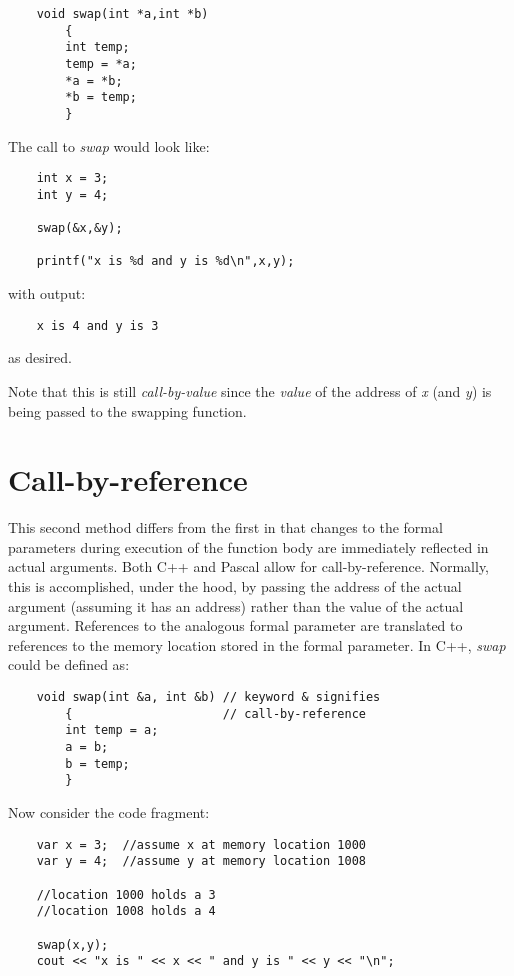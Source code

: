 \begin{verbatim}
    void swap(int *a,int *b)
        {
        int temp;
        temp = *a;
        *a = *b;
        *b = temp;
        }
\end{verbatim}

The call to {\it swap} would look like:

\begin{verbatim}
    int x = 3;
    int y = 4;

    swap(&x,&y);

    printf("x is %d and y is %d\n",x,y);
\end{verbatim}

with output:

\begin{verbatim}
    x is 4 and y is 3
\end{verbatim}

as desired.

Note that this is still {\it call-by-value} since the {\it value} of the
address of {\it x} (and {\it y}) is being passed to the swapping function.

\section*{Call-by-reference}

This second method differs from the first in that changes to
the formal parameters during execution of the function body are
immediately reflected in actual arguments. Both C++ and Pascal allow
for call-by-reference. Normally, this is accomplished,
under the hood, by passing the
address of the actual argument (assuming it has an address) rather than
the value of the actual argument. References to the analogous formal
parameter are translated to references to the memory location stored in
the formal parameter. In C++, {\it swap} could be defined as:

\begin{verbatim}
    void swap(int &a, int &b) // keyword & signifies
        {                     // call-by-reference
        int temp = a;
        a = b;
        b = temp;
        }
\end{verbatim}

Now consider the code fragment:

\begin{verbatim}
    var x = 3;  //assume x at memory location 1000
    var y = 4;  //assume y at memory location 1008

    //location 1000 holds a 3
    //location 1008 holds a 4

    swap(x,y);
    cout << "x is " << x << " and y is " << y << "\n";
\end{verbatim}

